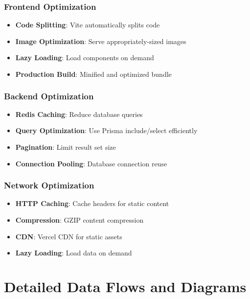 \documentclass[12pt,a4paper]{report}
\begin{document}
\subsection{Frontend Optimization}

\begin{itemize}
    \item \textbf{Code Splitting}: Vite automatically splits code
    \item \textbf{Image Optimization}: Serve appropriately-sized images
    \item \textbf{Lazy Loading}: Load components on demand
    \item \textbf{Production Build}: Minified and optimized bundle
\end{itemize}

\subsection{Backend Optimization}

\begin{itemize}
    \item \textbf{Redis Caching}: Reduce database queries
    \item \textbf{Query Optimization}: Use Prisma include/select efficiently
    \item \textbf{Pagination}: Limit result set size
    \item \textbf{Connection Pooling}: Database connection reuse
\end{itemize}

\subsection{Network Optimization}

\begin{itemize}
    \item \textbf{HTTP Caching}: Cache headers for static content
    \item \textbf{Compression}: GZIP content compression
    \item \textbf{CDN}: Vercel CDN for static assets
    \item \textbf{Lazy Loading}: Load data on demand
\end{itemize}

\newpage

\chapter{Detailed Data Flows and Diagrams}
\end{document}
